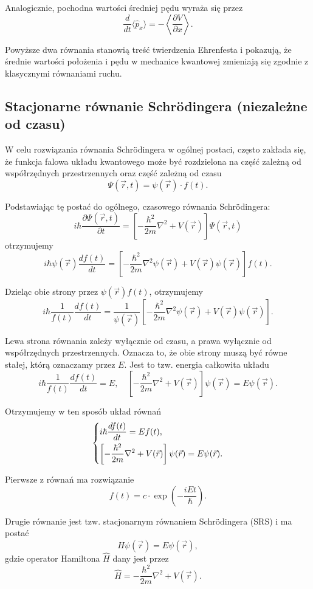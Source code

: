 Analogicznie, pochodna wartości średniej pędu wyraża się przez
$$
\frac{d}{dt} \langle \hat{p}_x \rangle = - \left\langle \frac{\partial V}{\partial x} \right\rangle.
$$

Powyższe dwa równania stanowią treść twierdzenia Ehrenfesta i pokazują, że średnie wartości położenia i pędu w mechanice kwantowej zmieniają się zgodnie z klasycznymi równaniami ruchu. 

\subsection{Stacjonarne równanie Schrödingera (niezależne od czasu)}

W celu rozwiązania równania Schrödingera w ogólnej postaci, często zakłada się, że funkcja falowa układu kwantowego może być rozdzielona na część zależną od współrzędnych przestrzennych oraz część zależną od czasu
$$
\Psi(\vec{r}, t) = \psi(\vec{r}) \cdot f(t).
$$

Podstawiając tę postać do ogólnego, czasowego równania Schrödingera:
$$
i\hbar \frac{\partial \Psi(\vec{r}, t)}{\partial t} = \left[ -\frac{\hbar^2}{2m} \nabla^2 + V(\vec{r}) \right] \Psi(\vec{r}, t)
$$
otrzymujemy
$$
i\hbar \psi(\vec{r}) \frac{df(t)}{dt} = \left[ -\frac{\hbar^2}{2m} \nabla^2 \psi(\vec{r}) + V(\vec{r}) \psi(\vec{r}) \right] f(t).
$$

Dzieląc obie strony przez $\psi(\vec{r}) f(t)$, otrzymujemy
$$
i\hbar \frac{1}{f(t)} \frac{df(t)}{dt} = \frac{1}{\psi(\vec{r})} \left[ -\frac{\hbar^2}{2m} \nabla^2 \psi(\vec{r}) + V(\vec{r}) \psi(\vec{r}) \right].
$$

Lewa strona równania zależy wyłącznie od czasu, a prawa wyłącznie od współrzędnych przestrzennych. Oznacza to, że obie strony muszą być równe stałej, którą oznaczamy przez $E$. Jest to tzw. energia całkowita układu
$$
i\hbar \frac{1}{f(t)} \frac{df(t)}{dt} = E, \quad
\left[ -\frac{\hbar^2}{2m} \nabla^2 + V(\vec{r}) \right] \psi(\vec{r}) = E \psi(\vec{r}).
$$

Otrzymujemy w ten sposób układ równań
$$
\begin{dcases}
i\hbar \frac{df(t)}{dt} = E f(t), \\
\left[ -\frac{\hbar^2}{2m} \nabla^2 + V(\vec{r}) \right] \psi(\vec{r}) = E \psi(\vec{r}).
\end{dcases}
$$

Pierwsze z równań ma rozwiązanie
$$
f(t) = c \cdot \exp\left( -\frac{iEt}{\hbar} \right).
$$

Drugie równanie jest tzw. stacjonarnym równaniem Schrödingera (SRS) i ma postać
$$
\hat{H} \psi(\vec{r}) = E \psi(\vec{r}),
$$
gdzie operator Hamiltona $\hat{H}$ dany jest przez
$$
\hat{H} = -\frac{\hbar^2}{2m} \nabla^2 + V(\vec{r}).
$$

